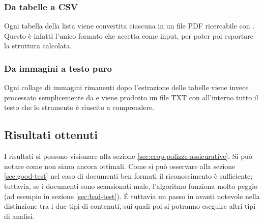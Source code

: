         \subsubsection{Da tabelle a CSV}
        Ogni tabella della lista viene convertita ciascuna in un file PDF ricercabile con \cite{prod:tesseract}. Questo è infatti l'unico formato che \cite{prod:tabula} accetta come input, per poter poi esportare la struttura calcolata.
        \subsubsection{Da immagini a testo puro}
        Ogni collage di immagini rimanenti dopo l'estrazione delle tabelle viene invece processato semplicemente da  e viene prodotto un file TXT con all'interno tutto il testo che lo strumento è riuscito a comprendere.
    \subsection{Risultati ottenuti}
    I risultati si possono visionare alla sezione \ref{sec:crop-polizze-assicurative}. Si può notare come non siano ancora ottimali. Come si può osservare alla sezione \ref{sec:good-test} nel caso di documenti ben formati il riconoscimento è sufficiente; tuttavia, se i documenti sono scansionati male, l'algoritmo funziona molto peggio (ad esempio in sezione \ref{sec:bad-test}). \'E tuttavia un passo in avanti notevole nella distinzione tra i due tipi di contenuti, sui quali poi si potranno eseguire altri tipi di analisi.
    
    
    
    
    
